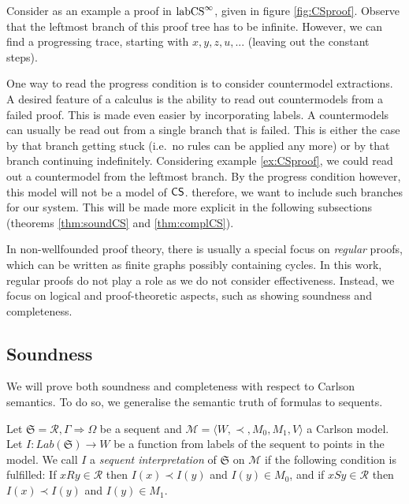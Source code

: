 \documentclass[runningheads,orivec]{llncs}
\newcommand{\CS}{\textnormal{\textsf{CS}}}
\newcommand{\labCS}{{\textnormal{labCS}^\infty}}
\newcommand{\Ra}{\Rightarrow}
\newcommand{\la}{\langle}
\newcommand{\ra}{\rangle}
\newcommand{\R}{\mathcal{R}}
\newcommand{\Mw}{\mathcal{M}}
\newcommand{\Seq}{\mathfrak{S}}
\begin{document}
\begin{example} \label{ex:CSproof}
    Consider as an example a proof in $\labCS$, given in figure \ref{fig:CSproof}. Observe that the leftmost branch of this proof tree has to be infinite. However, we can find a progressing trace, starting with $x,y,z,u,...$ (leaving out the constant steps).
\end{example}

One way to read the progress condition is to consider countermodel extractions. A desired feature of a calculus is the ability to read out countermodels from a failed proof. This is made even easier by incorporating labels. A countermodels can usually be read out from a single branch that is failed. This is either the case by that branch getting stuck (i.e.~no rules can be applied any more) or by that branch continuing indefinitely. Considering example \ref{ex:CSproof}, we could read out a countermodel from the leftmost branch. By the progress condition however, this model will not be a model of $\CS$. therefore, we want to include such branches for our system. This will be made more explicit in the following subsections (theorems \ref{thm:soundCS} and \ref{thm:complCS}).

In non-wellfounded proof theory, there is usually a special focus on \emph{regular} proofs, which can be written as finite graphs possibly containing cycles. 
In this work, regular proofs do not play a role as we do not consider effectiveness. Instead, we focus on logical and proof-theoretic aspects, such as showing soundness and completeness.


\subsection{Soundness}

We will prove both soundness and completeness with respect to Carlson semantics. To do so, we generalise the semantic truth of formulas to sequents.

\begin{definition} \label{def:SequInterpret}
    Let $\Seq = \R , \Gamma \Ra \Omega$ be a sequent and $\Mw = \la W , \prec, M_0 , M_1 , V \ra$ a Carlson model. 
    Let $I : Lab(\Seq) \to W$ be a function from labels of the sequent to points in the model.
    We call $I$ a \emph{sequent interpretation} of $\Seq$ on $\Mw$ if the following condition is fulfilled: If $xRy \in \R$ then $I(x) \prec I(y)$ and $I(y) \in M_0$, and if $xSy \in \R$ then $I(x) \prec I(y)$ and $I(y) \in M_1$.
\end{definition}
\end{document}
